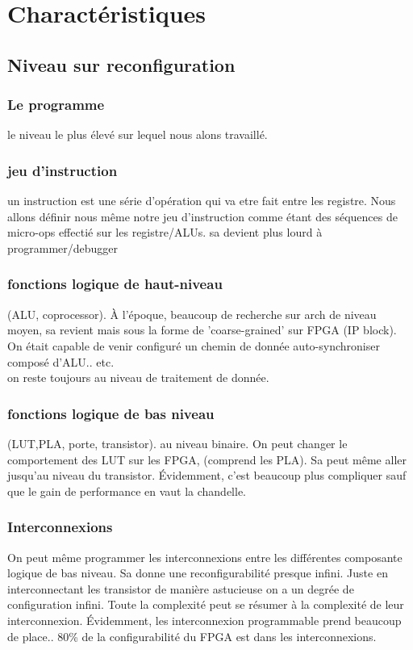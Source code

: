 \documentclass[oneside]{book}
\begin{document}
        \section{Charactéristiques}
        \subsection{Niveau sur reconfiguration}
        \subsubsection{Le programme}
        le niveau le plus élevé sur lequel nous alons travaillé. 
        \subsubsection{jeu d'instruction}
        un instruction est une série d'opération qui va etre fait entre les registre. Nous allons définir nous même notre jeu d'instruction comme étant des séquences de micro-ops effectié sur les registre/ALUs. sa devient plus lourd à programmer/debugger
        
        \subsubsection{fonctions logique de haut-niveau}
        (ALU, coprocessor). À l'époque, beaucoup de recherche sur arch de niveau moyen, sa revient mais sous la forme de 'coarse-grained' sur FPGA (IP block). On était capable de venir configuré un chemin de donnée auto-synchroniser composé d'ALU.. etc.\\
       
        on reste toujours au niveau de traitement de donnée.
        \subsubsection{fonctions logique de bas niveau}
        (LUT,PLA, porte, transistor). au niveau binaire. On peut changer le comportement des LUT sur les FPGA, (comprend les PLA). Sa peut même aller jusqu'au niveau du transistor. Évidemment, c'est beaucoup plus compliquer sauf que le gain de performance en vaut la chandelle.\\
        
        \subsubsection{Interconnexions}
        On peut même programmer les interconnexions entre les différentes composante logique de bas niveau. Sa donne une reconfigurabilité presque infini. Juste en interconnectant les transistor de manière astucieuse on a un degrée de configuration infini. Toute la complexité peut se résumer à la complexité de leur interconnexion.  Évidemment, les interconnexion programmable prend beaucoup de place.. 80\% de la configurabilité du FPGA est dans les interconnexions.\\
        
\end{document}

